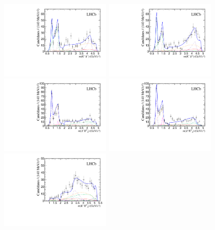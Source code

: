 \begin{figure}[!tb]
  \begin{center}
    \includegraphics*[width=0.47\textwidth]{figs/m12_Bs2KSKpi_Combined.pdf}
    \includegraphics*[width=0.47\textwidth]{figs/m12_Bs2KSpiK_Combined.pdf}
    \includegraphics*[width=0.47\textwidth]{figs/m23_Bs2KSKpi_Combined.pdf}
    \includegraphics*[width=0.47\textwidth]{figs/m13_Bs2KSpiK_Combined.pdf}
    \includegraphics*[width=0.47\textwidth]{figs/m13_Bs2KSKpi_Combined.pdf}

\end{center}
\end{figure}
